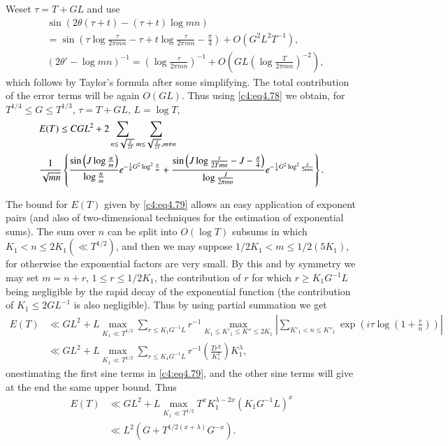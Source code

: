 We\pageoriginale set $\tau = T + GL$ and use
\begin{align*}
&  \sin (2 \theta (\tau +t) - (\tau+ t) \log mn)\\
&  = \sin \left(\tau \log \frac{\tau}{2 \pi mn} - \tau + t \log
  \frac{\tau}{2 \pi mn}- \frac{\pi}{4} \right) + O\left(G^2 L^2
  T^{-1}\right),\\ 
&  (2 \theta' - \log mn)^{-1} = \left(\log \frac{\tau}{2\pi mn}
  \right)^{-1} + O \left(GL \left(\log \frac{T}{2 \pi
    mn}\right)^{-2}\right), 
\end{align*}
which follows by Taylor's formula after some simplifying. The total
contribution of the error terms will be again $O(GL)$. Thus
using \eqref{c4:eq4.78} we obtain, for $T^{1/4} \leq G \leq T^{1/3}$,
$\tau = T + GL$, $L = \log T$,
{\fontsize{9pt}{11pt}\selectfont
\begin{align}
& E(T)\leq CGL^2 + 2 \sum_{n \leq \sqrt{\frac{T}{2T}}} \sum_{m \leq
  \sqrt{\frac{T}{2 T}}, m \neq n}\notag\\ 
&\frac{1}{\sqrt{mn}}\left\{ \frac{\sin \left(J \log
\frac{n}{m}\right)}{\log \frac{n}{m}} e^{-\frac{1}{4} G^2 \log^2
  \frac{n}{m}}
 +\frac{\sin \left(J \log \frac{\tau}{2 T mn} - 
        J - \frac{\pi}{4}\right)}{\log \frac{J}{2 \pi mn}}
      e^{-\frac{1}{4} G^2 \log^2 \frac{J}{2 \pi mn}}\right\}.\label{c4:eq4.79}
\end{align}}

The bound for $E(T)$ given by \eqref{c4:eq4.79} allows an easy
application of exponent pairs (and also of two-dimensional techniques
for the estimation of exponential sums). The sum over $n$ can be split
into $O(\log T)$ subsums in which $K_1 < n \leq 2K_1 (\ll T^{1/2})$,
and then we may suppose $1/2 K_1 < m \leq 1/2 (5K_1)$, for otherwise
the exponential factors are very small. By this and by symmetry we may
set $m= n+r$, $1 \leq r \leq 1/2 K_1$, the contribution of $r$ for
which $r\geq K_1 G^{-1} L$ being negligible by the rapid decay of the
exponential function (the contribution of $K_1 \leq 2 GL^{-1}$ is also
negligible). Thus by using partial summation we get
{\fontsize{10}{12}\selectfont
\begin{align*}
  E(T) & \ll GL^2 + L \max\limits_{K_1 \ll T^{1/2}} \sum_{r \leq K_1
    G^{-1}L} r^{-1} \max_{K_1 \leq K'_1 \leq K''\leq 2 K_1} \left|
    \sum_{K'_1 < n \leq K''_1} \exp \left(i \tau \log \left(1+
    \frac{r}{n} \right) \right)\right|\\
    & \ll GL^2 + L \max\limits_{K_1 \ll T^{1/2}} \sum_{r \leq K_1
      G^{-1}L} r^{-1} \left(\frac{Tr^\chi}{K^2_1} \right) K_1^\lambda,
\end{align*}}
on\pageoriginale estimating the first sine terms in \eqref{c4:eq4.79},
and the other 
sine terms will give at the end the same upper bound. Thus
\begin{align*}
  E(T) & \ll GL^2 +L \max\limits_{K_1 \ll T^{1/2}} T^x K_1^{\lambda -
  2x}  (K_1 G^{-1} L)^x\\
  & \ll L^2 \left(G + T^{1/2 (x+ \lambda)}G^{-x}\right).
\end{align*}

